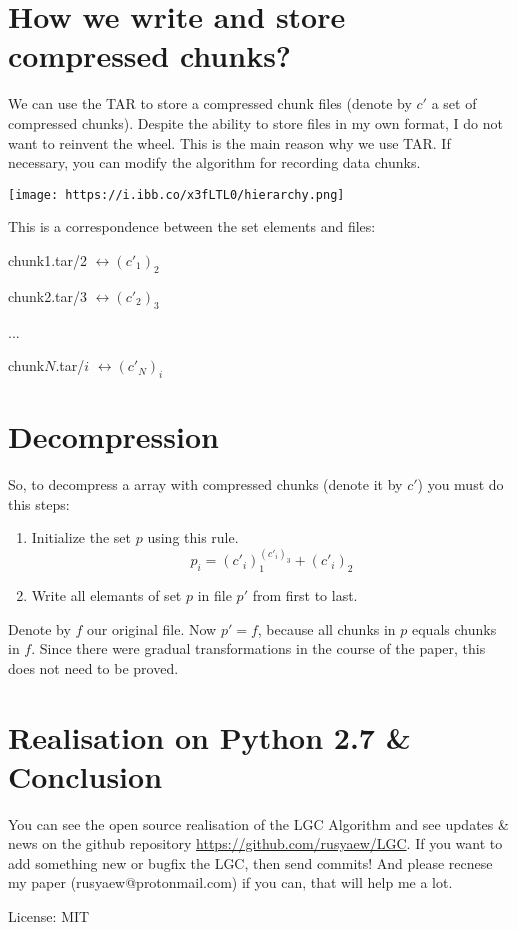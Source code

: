 \documentclass[12pt]{article}
\begin{document}
\section{How we write and store compressed chunks?}
We can use the TAR to store a compressed chunk files (denote by $c'$ a set of compressed chunks).
Despite the ability to store files in my own format, I do not want to reinvent the wheel. This is the main reason why we use TAR. If necessary, you can modify the algorithm for recording data chunks.

\begin {center}
  \texttt{[image: https://i.ibb.co/x3fLTL0/hierarchy.png]}\\
\end {center}
This is a correspondence between the set elements and files:

chunk1.tar/2 $\leftrightarrow (c'_1)_2$

chunk2.tar/3 $\leftrightarrow (c'_2)_3$

...

chunk$N$.tar/$i$ $\leftrightarrow (c'_N)_i$

\section{Decompression}

So, to decompress a array with compressed chunks (denote it by $c'$) you must do this steps:
\begin{enumerate}
  \item Initialize the set $p$ using this rule.
  $$p_i = (c'_i)_1^{(c'_i)_3} + (c'_i)_2$$
  \item Write all elemants of set $p$ in file $p'$ from first to last.
\end{enumerate}
Denote by $f$ our original file. Now $p' = f$, because  all chunks in $p$ equals chunks in $f$. 
Since there were gradual transformations in the course of the paper, this does not need to be proved.

\section{Realisation on Python 2.7 & Conclusion}

You can see the open source realisation of the LGC Algorithm and see updates & news on the github repository \url{https://github.com/rusyaew/LGC}.
If you want to add something new or bugfix the LGC, then send commits! And please recnese my paper (rusyaew@protonmail.com) if you can, that will help me a lot.
\begin{center}
License: MIT
\end{center}
\end{document}
